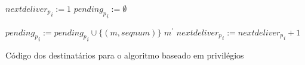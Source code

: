 \begin{algorithm}
\DontPrintSemicolon
{}

${{nextdeliver}_p}_{i} := 1$\;
${{pending}_p}_{i} := \emptyset$\;

 {
  ${{pending}_p}_{i} := {{pending}_p}_{i} \cup \{(m, seqnum)\}$\;
   {
     ${m}^{\prime}$\;
    ${{nextdeliver}_p}_{i} := {{nextdeliver}_p}_{i} + 1$\;
  }
}
\caption{Código dos destinatários para o algoritmo baseado em privilégios}
\label{algo:priviledge-based-simple-destinations}
\end{algorithm}

